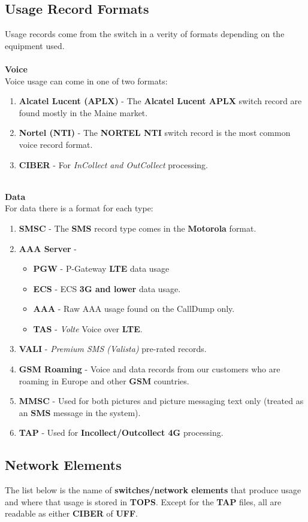 \documentclass[12pt,twoside]{article}
\begin{document}
\subsection{Usage Record Formats}
\label{sec:orgheadline1}
Usage records come from the switch in a verity of formats depending on the equipment used.
\mbox{} \\
\mbox{} \\
\textbf{Voice}\\
   Voice usage can come in one of two formats:
\begin{enumerate}
\item \textbf{Alcatel Lucent (APLX)} - The \textbf{Alcatel Lucent APLX} switch record
are found mostly in the Maine market.
\item \textbf{Nortel (NTI)} - The \textbf{NORTEL NTI} switch record is the most common
voice record format.
\item \textbf{CIBER} - For \emph{InCollect and OutCollect} processing.
\end{enumerate}
\mbox{} \\
\textbf{Data}\\
   For data there is a format for each type:
\begin{enumerate}
\item \textbf{SMSC} - The \textbf{SMS} record type comes in the \textbf{Motorola} format.
\item \textbf{AAA Server} - 
\begin{itemize}
\item \textbf{PGW} - P-Gateway \textbf{LTE} data usage
\item \textbf{ECS} - ECS \textbf{3G and lower} data usage.
\item \textbf{AAA} - Raw AAA usage found on the CallDump only.
\item \textbf{TAS} - \emph{Volte} Voice over \textbf{LTE}.
\end{itemize}
\item \textbf{VALI} - \emph{Premium SMS (Valista)} pre-rated records.
\item \textbf{GSM Roaming} - Voice and data records from our customers who are
roaming in Europe and other \textbf{GSM} countries.
\item \textbf{MMSC} - Used for both pictures and picture messaging text only
(treated as an \textbf{SMS} message in the system).
\item \textbf{TAP} - Used for \textbf{Incollect/Outcollect 4G} processing.
\end{enumerate}
\newpage
\subsection{Network Elements}
\label{sec:orgheadline2}
The list below is the name of \textbf{switches/network elements} that produce usage and where that usage is stored in \textbf{TOPS}.
Except for the \textbf{TAP} files, all are readable as either \textbf{CIBER} of \textbf{UFF}.
\mbox{} \\
\footnotesize
\end{document}
